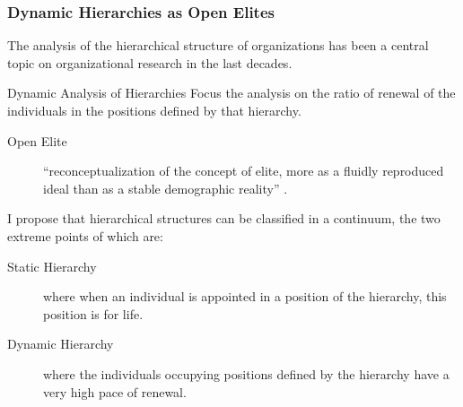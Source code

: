 \documentclass[ignorenonframetext,red,8pt,notes=hide]{beamer}
\begin{document}
\begin{frame}
\frametitle{Dynamic Hierarchies as Open Elites}

The analysis of the hierarchical structure of organizations has been a central topic on organizational research in the last decades.

\begin{block}{Dynamic Analysis of Hierarchies}
Focus the analysis on the ratio of renewal of the individuals in the positions defined by that hierarchy.

\begin{description}
\item[Open Elite] ``reconceptualization of the concept of elite, more as a fluidly reproduced ideal than as a stable demographic reality'' \citep[360]{padgett:2010}.
\end{description}

\end{block}

\pause

\vspace{0.5cm}

I propose that hierarchical structures can be classified in a continuum, the two extreme points of which are: 

\begin{description}
\item[Static Hierarchy] where when an individual is appointed in a position of the hierarchy, this position is for life.
\item[Dynamic Hierarchy] where the individuals occupying positions defined by the hierarchy have a very high pace of renewal.
\end{description}

\end{frame}
\end{document}
